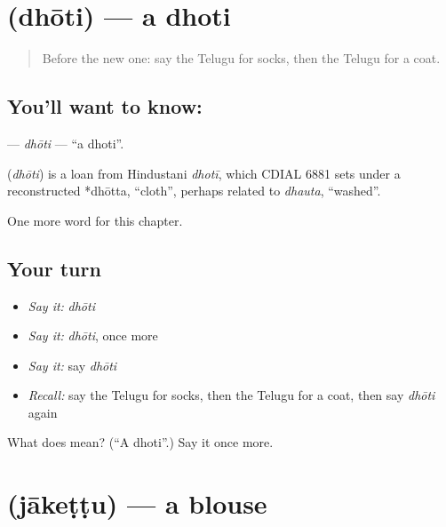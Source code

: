 \section[\texorpdfstring{\te{ధోతి} (dhōti)}{ధోతి (dhōti)}]{ (dhōti) — a dhoti}

\label{lesson:TE-C132-dhoti}



\begin{quote}
Before the new one: say the Telugu for socks, then the Telugu for a coat.
\end{quote}

\subsection*{You'll want to know: }
\textbf{} — \emph{dhōti} — \textquotedblleft{}a dhoti\textquotedblright{}.

\begin{cousinweb}
\textbf{} (\emph{dhōti}) is a loan from Hindustani \emph{dhotī}, which CDIAL 6881 sets under a reconstructed *dhōtta, \textquotedblleft{}cloth\textquotedblright{}, perhaps related to \emph{dhauta}, \textquotedblleft{}washed\textquotedblright{}.
\end{cousinweb}

\begin{grammarlens}[title={What you've built}]
One more word for this chapter.
\end{grammarlens}

\subsection*{Your turn}
\begin{itemize}
\raggedright
  \item \emph{Say it:} \emph{dhōti}
  \item \emph{Say it:} \emph{dhōti}, once more
  \item \emph{Say it:} say \emph{dhōti}
  \item \emph{Recall:} say the Telugu for socks, then the Telugu for a coat, then say \emph{dhōti} again
\end{itemize}

\begin{tcolorbox}[breakable,colback=teal!4,colframe=teal!35!black,title={Before you move on}]
What does  mean? (\textquotedblleft{}A dhoti\textquotedblright{}.) Say it once more.
\end{tcolorbox}
\section[\texorpdfstring{\te{జాకెట్టు} (jākeṭṭu)}{జాకెట్టు (jākeṭṭu)}]{ (jākeṭṭu) — a blouse}

